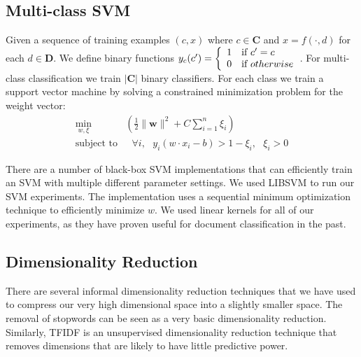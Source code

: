 
\subsection{Multi-class SVM} %
\label{sub:multiclass_svm}

Given a sequence of training examples $(c, x)$ where $c \in \mathbf{C}$ and $x = f(\cdot, d)$ for each $d \in \mathbf{D}$. We define binary functions $y_c(c
') = \left\{ \begin{array}{ll} 1 & \mbox{if }  c' = c \\ 0 & \mbox{if } otherwise \end{array} \right.$. For multi-class classification we train $| \mathbf{C} |$ binary classifiers. For each class we train a support vector machine by solving a constrained minimization problem for the weight vector:
\begin{align*}
	\min_{w,\xi} & \left( \frac{1}{2} \| \mathbf{w} \|^2 + C \sum_{i=1}^n \xi_i \right) \\
	\text{subject to} &  \text{ } \forall i, \text{ } y_i(w \cdot x_i - b) > 1 - \xi_i, \text{ } \xi_i > 0
\end{align*}

There are a number of black-box SVM implementations that can efficiently train an SVM with multiple different parameter settings. We used LIBSVM\cite{CC01a} to run our SVM experiments. The implementation uses a sequential minimum optimization technique\cite{Fan05workingset} to efficiently minimize $w$. We used linear kernels for all of our experiments, as they have proven useful for document classification in the past\cite{DBLP:conf/ecml/Joachims98}.










\subsection{Dimensionality Reduction}
There are several informal dimensionality reduction techniques that we have used to compress our very high dimensional space into a slightly smaller space. The removal of stopwords can be seen as a very basic dimensionality reduction. Similarly, TFIDF is an unsupervised dimensionality reduction technique that removes dimensions that are likely to have little predictive power.


